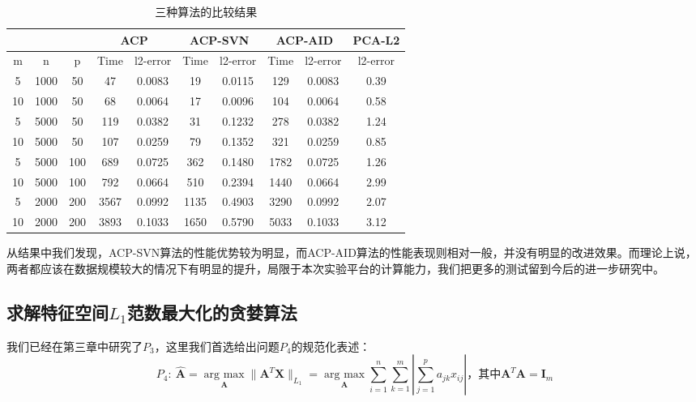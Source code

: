 \begin{table}[H]
    \small
    \centering
    \caption{三种算法的比较结果}
    \label{three-l1-pca}
    \begin{tabular}{@{}cccccccccc@{}}
    \toprule
       &      &     & \multicolumn{2}{c}{ACP} & \multicolumn{2}{c}{ACP-SVN} & \multicolumn{2}{c}{ACP-AID} & PCA-L2   \\ \midrule
    m  & n    & p   & Time     & l2-error     & Time       & l2-error       & Time       & l2-error       & l2-error \\ \midrule
    5  & 1000  & 50  & 47       & 0.0083       & 19         & 0.0115         & 129        & 0.0083         & 0.39     \\
    10 & 1000  & 50  & 68       & 0.0064       & 17         & 0.0096         & 104        & 0.0064         & 0.58     \\
    5  & 5000 & 50  & 119      & 0.0382       & 31         & 0.1232         & 278        & 0.0382         & 1.24     \\
    10 & 5000 & 50  & 107      & 0.0259       & 79         & 0.1352         & 321        & 0.0259         & 0.85     \\
    5  & 5000 & 100 & 689      & 0.0725       & 362        & 0.1480         & 1782       & 0.0725         & 1.26     \\
    10 & 5000 & 100 & 792      & 0.0664       & 510        & 0.2394         & 1440       & 0.0664         & 2.99     \\
    5  & 2000  & 200 & 3567     & 0.0992       & 1135       & 0.4903         & 3290       & 0.0992         & 2.07     \\
    10 & 2000  & 200 & 3893     & 0.1033       & 1650       & 0.5790         & 5033       & 0.1033         & 3.12     \\ \bottomrule
    \end{tabular}
\end{table}

从结果中我们发现，ACP-SVN算法的性能优势较为明显，而ACP-AID算法的性能表现则相对一般，并没有明显的改进效果。而理论上说，
两者都应该在数据规模较大的情况下有明显的提升，局限于本次实验平台的计算能力，我们把更多的测试留到今后的进一步研究中。


\subsection{求解特征空间$L_1$范数最大化的贪婪算法}

我们已经在第三章中研究了$P_3$，这里我们首选给出问题$P_4$的规范化表述：
\begin{equation}\label{p4}
    P_4: \ \hat{\bm A} = \underset{\bm{A}}{\operatorname{arg \ max}} \| \bm A^T \bm X\|_{L_1}
    = \underset{\bm A}{\operatorname{arg\ max}} 
    \sum_{i=1}^{n}\sum_{k=1}^{m}|\sum_{j=1}^p{a}_{jk}x_{ij}|
     \text{，其中}\bm A^T\bm A = \bm I_m
\end{equation}

